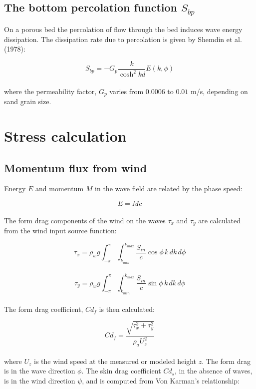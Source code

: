 \documentclass[letterpaper]{article}
\numberwithin{equation}{section}
\begin{document}
\subsection{The bottom percolation function $S_{bp}$}

On a porous bed the percolation of flow through the bed induces wave energy dissipation. The dissipation rate due 
to percolation is given by Shemdin et al. (1978):

\begin{equation}
S_{bp}= -G_{p}\dfrac{k}{\cosh^{2}kd} E(k,\phi)
\label{sbp} 
\end{equation}
\\
where the permeability factor, $G_{p}$ varies from $0.0006$ to $0.01$ m/s, depending on sand grain size.


\newpage
\section{Stress calculation}

\subsection{Momentum flux from wind}
\label{sec:wind_stress}

Energy $E$ and momentum $M$ in the wave field are related by the phase speed:

\begin{equation}
E=Mc
\end{equation}
\\
The form drag components of the wind on the waves $\tau_{x}$ and $\tau_{y}$ 
are calculated from the wind input source function:

\begin{equation}
\tau_{x}=\rho_{w}g\int_{-\pi}^{\pi}\!\int_{k_{min}}^{k_{max}}\dfrac{S_{in}}{c}\cos{\phi}\,k\,dk\,d\phi
\end{equation}
\\
\begin{equation}
\tau_{y}=\rho_{w}g\int_{-\pi}^{\pi}\!\int_{k_{min}}^{k_{max}}\dfrac{S_{in}}{c}\sin{\phi}\,k\,dk\,d\phi
\end{equation}
\\
The form drag coefficient, $Cd_{f}$ is then calculated:

\begin{equation}
Cd_{f}=\dfrac{\sqrt{\tau_{x}^{2}+\tau_{y}^{2}}}{\rho_{a}U_{z}^{2}}
\end{equation}
\\
where $U_{z}$ is the wind speed at the measured or modeled height $z$.
The form drag is in the wave direction $\phi$. 
The skin drag coefficient $Cd_{s}$, in the absence of waves, is in the wind direction $\psi$,
and is computed from Von Karman's relationship:
\end{document}
